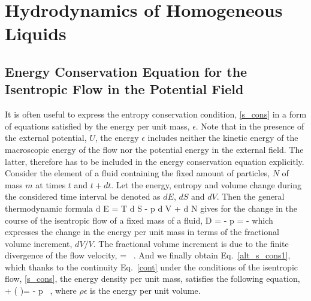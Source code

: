 ﻿%
\appendix
\titleformat{\chapter}[display]   
{\normalfont\large\bfseries\centering}{\chaptertitlename\ \thechapter}{10pt}{\large}   
\titlespacing*{\chapter}{0pt}{-20pt}{25pt}

\chapter{Hydrodynamics of Homogeneous Liquids}
\section{Energy Conservation Equation for the Isentropic Flow in the Potential Field}%
\label{app:s_cons}
\setcounter{equation}{0}

It is often useful to express the entropy conservation condition, \eqref{s_cons} in a form of equations satisfied by the energy per unit mass, $\epsilon$.
Note that in the presence of the external potential, $U$, the energy  $\epsilon$ includes neither the kinetic energy of the macroscopic energy of the flow nor  the potential energy in the external field.
The latter, therefore has to be included in the energy conservation equation explicitly.
Consider the element of a fluid containing the fixed amount of particles, $N$ of mass $m$ at times $t$ and $t + d t$.
Let the energy, entropy and volume change during the  considered time interval be denoted as $dE$, $dS$ and $dV$.
Then the general thermodynamic formula
\be\label{dE}
d E = T d S - p d V + \mu d N
\ee
gives for the change in the course of the isentropic  flow of a fixed mass of a fluid,
\be
D \epsilon = - p   = -   
\ee
which expresses the change in the energy per unit mass in terms of the fractional volume increment, $d V / V$.
The fractional volume increment is due to the finite divergence of the flow velocity,
\be
{} = \bm{\nabla} \cdot {} \, .
\ee
And we finally obtain Eq.~\eqref{alt_s_cons1}, which thanks to
the continuity Eq.~\eqref{cont} under the conditions of the isentropic flow, \eqref{s_cons}, the energy density per unit mass,  satisfies the following equation,  
\be\label{alt_s_cons2}
  + \bm{\nabla} ( \rho \epsilon)= -  p \bm{\nabla} \cdot {} \, ,
\ee
where $\rho \epsilon$ is the energy per unit volume.

